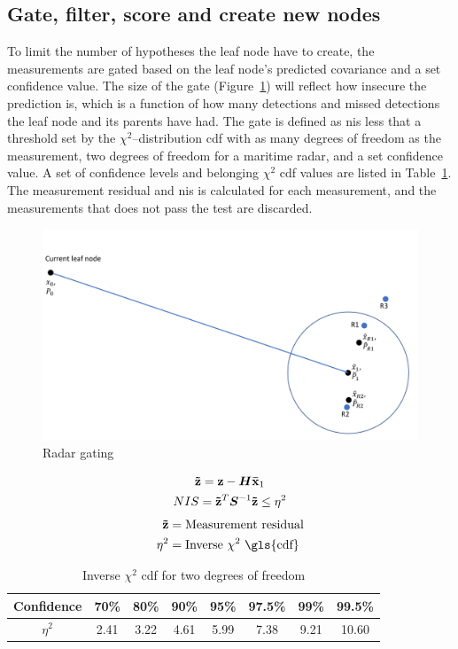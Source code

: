 \subsection{Gate, filter, score and create new nodes}
To limit the number of hypotheses the leaf node have to create, the measurements are gated based on the leaf node's predicted covariance and a set confidence value. The size of the gate (Figure~\ref{fig:radar_gating}) will reflect how insecure the prediction is, which is a function of how many detections and missed detections the leaf node and its parents have had. The gate is defined as \gls{nis} less that a threshold set by the \(\chi^2\)--distribution \gls{cdf} with as many degrees of freedom as the measurement, two degrees of freedom for a maritime radar, and a set confidence value. A set of confidence levels and belonging \(\chi^2\) \gls{cdf} values are listed in Table~\ref{tab:chi_square}. The measurement residual and \gls{nis} is calculated for each measurement, and the measurements that does not pass the test are discarded.
\begin{figure}
\centering
\includegraphics[width = .8\textwidth]{Figures/radar_gating.pdf}
\caption{Radar gating}\label{fig:radar_gating}
\end{figure}
\begin{equation}\label{eq:gate}
\begin{gathered}
\boldsymbol{\mathbf{\tilde{z}}} = \boldsymbol{\mathbf{z}} - \bm{H}\boldsymbol{\mathbf{\bar{x}}}_1 \\
NIS = \boldsymbol{\mathbf{\tilde{z}}}^T	\bm{S}^{-1} \boldsymbol{\mathbf{\tilde{z}}} \leq \eta^2
\end{gathered}
\end{equation}
\begin{equation*}
\begin{split}
\V{\tilde{z}}	&= \text{Measurement residual} \\
\eta^2 			&= \text{Inverse \(\chi^2\) \gls{cdf}} \\
\end{split}
\end{equation*}
\begin{table}
\centering
\begin{tabular}{c c c c c c c c}
Confidence 	& 70\% 	& 80\% 	& 90\% 	& 95\% 	& 97.5\% 	& 99\% 	& 99.5\% \\ 
\midrule
\(\eta^2\) 	& 2.41 	& 3.22 	& 4.61 	& 5.99 	& 7.38 		& 9.21 	& 10.60
\end{tabular}\caption{Inverse \(\chi^2\) \gls{cdf} for two degrees of freedom}
~\label{tab:chi_square}
\end{table}


